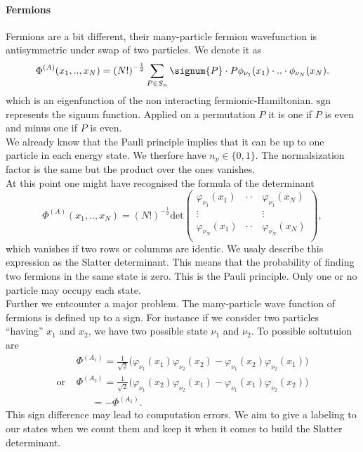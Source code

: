 \documentclass[../main.tex]{subfile}
\begin{document}
\paragraph{Fermions}
Fermions are a bit different, their many-particle fermion wavefunction is antisymmetric under swap of two particles. We denote it as
\[
    \Phi^{(A)}(x_1,..,x_N) = \left(N!\right)^{-\frac{1}{2}} \sum_{P\in S_n} \signum{P}\cdot P \phi_{\nu_1}(x_1)\cdot ..\cdot \phi_{\nu_N}(x_N).
\]
which is an eigenfunction of the non interacting fermionic-Hamiltonian.
$\text{sgn}$ represents the signum function. Applied on a permutation $P$ it is one if $P$ is even and minus one if $P$ is even.\\
We already know that the Pauli principle implies that it can be up to one particle in each energy state. We therfore have $n_\nu \in \{0,1\}$. The normalsization
factor is the same but the product over the ones vanishes.\\

At this point one might have recognised the formula of the determinant
\[
    \Phi^{(A)}(x_1,..,x_N) = \left(N!\right)^{-\frac{1}{2}} \text{det}\begin{pmatrix}
        \varphi_{\nu_1}(x_1)& \cdot\cdot &\varphi_{\nu_1}(x_N)\\
        \vdots&  &\vdots\\
        \varphi_{\nu_N}(x_1)& \cdot\cdot &\varphi_{\nu_N}(x_N)\\

    \end{pmatrix},
\]
which vanishes if two rows or columms are identic. We usaly describe this expression as the Slatter determinant. This means that the probability of finding two fermions in the same state is zero.
This is the Pauli principle. Only one or no particle may occupy each state.\\

Further we entcounter a major problem. The many-particle wave function of fermions is defined up to a sign. For instance if we consider
two particles ``having'' $x_1$ and $x_2$, we have two possible state $\nu_1$ and $\nu_2$. To possible soltutuion are
\begin{align*}
    &\Phi^{(A_1)} = \frac{1}{\sqrt{2}} \bigl(\varphi_{\nu_1} (x_1)\varphi_{\nu_2} (x_2) - \varphi_{\nu_1} (x_2)\varphi_{\nu_2} (x_1) \bigr)\\
    \text{or~} &\Phi^{(A_2)} = \frac{1}{\sqrt{2}} \bigl(\varphi_{\nu_1} (x_2)\varphi_{\nu_2}(x_1) - \varphi_{\nu_1} (x_1)\varphi_{\nu_2} (x_2)\bigr)\\
    &~~~~~~~=-\Phi^{(A_1)}.
\end{align*}
This sign difference may lead to computation errors. We aim to give a labeling to our states when we count them and keep it when it 
comes to build the Slatter determinant.\\
\end{document}
